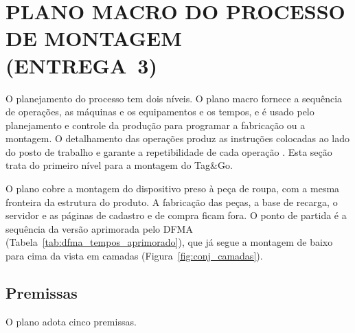 \section[PLANO MACRO DO PROCESSO DE MONTAGEM (ENTREGA 3)]{PLANO MACRO DO PROCESSO DE MONTAGEM\\(ENTREGA~3)}
\label{sec:plano_macro}

O planejamento do processo tem dois níveis. O plano macro fornece a sequência de operações, as máquinas e os equipamentos e os tempos, e é usado pelo planejamento e controle da produção para programar a fabricação ou a montagem. O detalhamento das operações produz as instruções colocadas ao lado do posto de trabalho e garante a repetibilidade de cada operação \cite{rozenfeld2006gestao}. Esta seção trata do primeiro nível para a montagem do Tag\&Go.

O plano cobre a montagem do dispositivo preso à peça de roupa, com a mesma fronteira da estrutura do produto. A fabricação das peças, a base de recarga, o servidor e as páginas de cadastro e de compra ficam fora. O ponto de partida é a sequência da versão aprimorada pelo DFMA (Tabela~\ref{tab:dfma_tempos_aprimorado}), que já segue a montagem de baixo para cima da vista em camadas (Figura~\ref{fig:conj_camadas}).

\subsection{Premissas}
\label{subsec:plano_premissas}

O plano adota cinco premissas.

